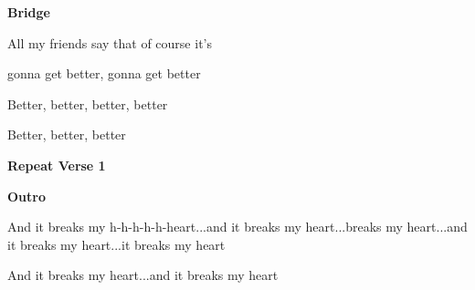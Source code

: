 \textbf{Bridge}

All my friends say that of course it's

gonna get better, gonna get better
                       
Better, better, better, better
               
Better, better, better

\textbf{Repeat Verse 1}

\textbf{Outro}
                          
And it breaks my h-h-h-h-h-heart...and it breaks my heart...breaks my heart...and it breaks my heart...it breaks my heart
                 
And it breaks my heart...and it breaks my heart


